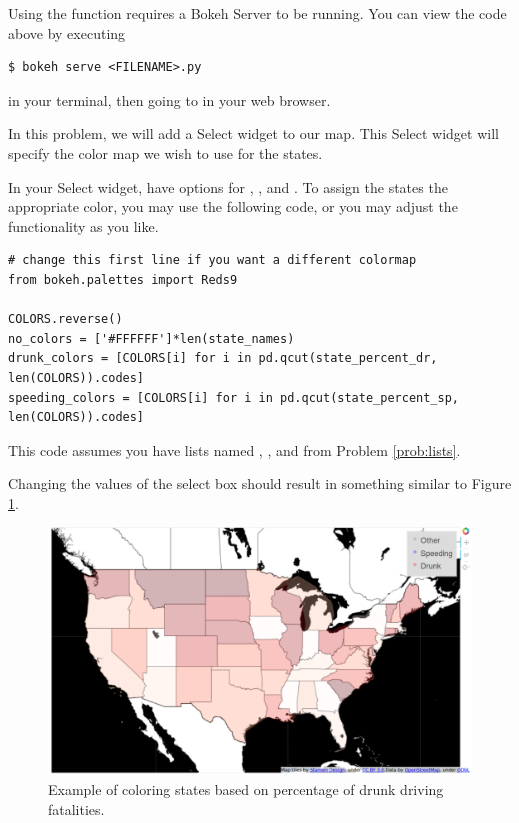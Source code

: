 Using the  function requires a Bokeh Server to be running.
You can view the code above by executing
\begin{lstlisting}
$ bokeh serve <FILENAME>.py
\end{lstlisting}
in your terminal, then going to  in your web
browser.

\begin{problem}
In this problem, we will add a Select widget to our map. This Select widget will
specify the color map we wish to use for the states.

In your Select widget, have options for , , and
. To assign the states the appropriate color, you may use
the following code, or you may adjust the functionality as you like.

\begin{lstlisting}
# change this first line if you want a different colormap
from bokeh.palettes import Reds9

COLORS.reverse()
no_colors = ['#FFFFFF']*len(state_names)
drunk_colors = [COLORS[i] for i in pd.qcut(state_percent_dr, len(COLORS)).codes]
speeding_colors = [COLORS[i] for i in pd.qcut(state_percent_sp, len(COLORS)).codes]
\end{lstlisting}

This code assumes you have lists named , ,
and  from Problem \ref{prob:lists}.

Changing the values of the select box should result in something similar to
Figure \ref{fig:select}.
\end{problem}

\begin{figure}
    \includegraphics[width=.7\linewidth]{BokehFigs/color_states.pdf}
    \caption{Example of coloring states based on percentage of drunk
            driving fatalities.}
    \label{fig:select}
\end{figure}

